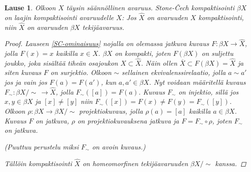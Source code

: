 \documentclass[12pt,a4paper,leqno]{report}
\theoremstyle{plain}
\newtheorem{lause}[equation]{Lause}
\theoremstyle{definition}
\theoremstyle{remark}
\begin{document}
\begin{lause}
Olkoon $X$ täysin säännöllinen avaruus. 
Stone-Čech kompaktisointi $\beta X$ on laajin 
kompaktisointi avaruudelle $X$: 
Jos $\hat{X}$ on avaruuden $X$ kompaktisointi, 
niin $\hat{X}$ on avaruuden $\beta X$ tekijäavaruus. 
\begin{proof}
Lauseen \ref{SC-ominaisuus} nojalla on olemassa 
jatkuva kuvaus $F\colon \beta X\rightarrow \hat{X}$, 
jolla $F(x)=x$ kaikilla $x\in X$. 
$\beta X$ on kompakti, joten $F(\beta X)$ on suljettu joukko, 
joka sisältää tiheän osajoukon $X\subset \hat{X}$. 
Näin ollen $\overline{X}\subset F(\beta X)= \hat{X}$ 
ja siten kuvaus $F$ on surjektio. 
Olkoon $\sim$ sellainen ekvivalenssirelaatio, jolla $a\sim a'$ jos ja vain jos $F(a)=F(a')$, kun $a,a'\in \beta X$. 
Nyt voidaan määritellä kuvaus 
$F_{\sim}\colon \beta X /\sim\,\rightarrow \hat{X}$, jolla $F_{\sim}([a])=F(a)$. 
Kuvaus $F_{\sim}$ on injektio, sillä jos $x,y\in \beta X$ ja $[x]\neq [y]$ niin $F_{\sim}([x])=F(x)\neq F(y)=F_{\sim}([y])$. 
Olkoon $\rho\colon \beta X\rightarrow \beta X/\sim$ projektiokuvaus, 
jolla $\rho(a)=[a]$ kaikilla $a\in\beta X$. Kuvaus $F$ on jatkuva, 
$\rho$ on projektiokuvauksena jatkuva ja $F=F_{\sim}\circ \rho$, 
joten $F_{\sim}$ on jatkuva. 

(Puuttuu perustelu miksi $F_{\sim}$ on avoin kuvaus.)

Tällöin kompaktisointi $\hat{X}$ on homeomorfinen tekijäavaruuden 
$\beta X / \sim$ kanssa. 
\end{proof}
\end{lause}
\end{document}
